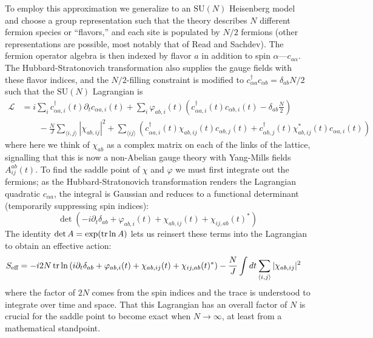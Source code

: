 \documentclass{report}
\begin{document}
To employ this approximation we generalize to an $ \text{SU}(N) $ Heisenberg 
model and choose a group representation such that the theory describes $ N $ 
different fermion species or ``flavors,'' and each site is populated by $ N/2 $
fermions (other representations are possible, most notably that of Read and
Sachdev). The fermion operator algebra is then indexed 
by flavor $ a $ in addition to spin $ \alpha $---$ c_{a\alpha} $. The Hubbard-Stratonovich 
transformation also supplies the gauge fields with these flavor indices, and 
the $N/2$-filling constraint is modified to $ c_{\alpha a}^\dagger c_{\alpha b}
= \delta_{ab} N/2 $ such that the $ \text{SU}(N) $ Lagrangian is 
\begin{align}
	\mathcal{L}
		&=i\sum_i c_{\alpha a, i}^\dagger(t) \partial_t c_{\alpha a, i}(t)
			+ \sum_i \varphi_{ab,i}(t) 
				(c_{\alpha a, i}^\dagger (t) c_{\alpha b, i}(t) - \delta_{ab}\tfrac{N}{2})\\
				&\qquad - \frac{N}{J}\sum_{\langle i,j \rangle} |\chi_{ab,ij}|^2
				+ \sum_{\langle ij \rangle} \left(
					c_{\alpha a, i}^\dagger(t) \chi_{ab,ij} (t) c_{\alpha b, j} (t) 
					+ c_{\alpha b,j}^\dagger (t)\chi_{ab,ij}^\ast(t) c_{\alpha a, i}(t)
				\right)\nonumber
\end{align}
where here we think of $ \chi_{ab} $ as a complex matrix on each of the links 
of the lattice, signalling that this is now a non-Abelian gauge theory with 
Yang-Mills fields $ A^{ab}_{ij}(t) $.
To find the saddle point of $ \chi $ and $ \varphi $ we must first integrate out 
the fermions; as the Hubbard-Stratonovich transformation renders the Lagrangian 
quadratic $ c_{\alpha a} $, the integral is Gaussian and reduces to a functional 
determinant (temporarily suppressing spin indices): 
\begin{equation*}
	\det\left(-i \partial_t \delta_{ab} + \varphi_{ab, i}(t) + \chi_{ab,ij} (t)
		+ \chi_{ij,ab}(t)^\ast  \right)
\end{equation*}
The identity $ \det A = \exp(\tr \ln A) $ lets us reinsert these terms into the 
Lagrangian to obtain an effective action: 
\begin{align}\label{eq:s-eff}
	S_{\text{eff}}
		&=
		-i 2 N\tr \ln \left(i \partial_t \delta_{ab} + \varphi_{ab, i}(t) + \chi_{ab,ij} (t)
		+ \chi_{ij,ab}(t)^\ast  \right) - \frac{N}{J}\int dt\sum_{\langle i,j \rangle} |\chi_{ab,ij}|^2
\end{align}
where the factor of $ 2N $ comes from the spin indices and the trace is understood
to integrate over time and space. That this Lagrangian has an overall factor 
of $ N $ is crucial for the saddle point to become exact when $ N \rightarrow \infty $, 
at least from a mathematical standpoint. 
\end{document}
